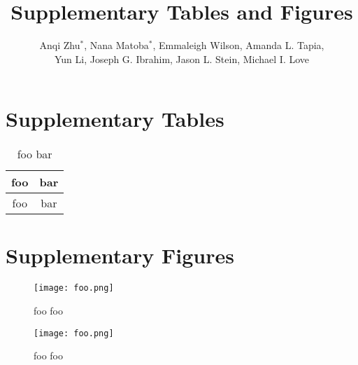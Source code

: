 \documentclass[11pt]{article}
\title{Supplementary Tables and Figures}
\author{Anqi Zhu$^*$, Nana Matoba$^*$, Emmaleigh Wilson, Amanda L. Tapia,
  \\ Yun Li, Joseph G. Ibrahim, Jason L. Stein, Michael I. Love}
\begin{document}
\maketitle

\section*{Supplementary Tables}

\begin{table}[!ht]
\centering
\begin{tabular}{c|c}
foo & bar \\
\hline
foo & bar \\
\end{tabular}
\caption{foo bar} 
\end{table}

\clearpage

\section*{Supplementary Figures}

\begin{figure}[!ht]
  \centering
  \texttt{[image: foo.png]}
  \caption{foo foo}
\end{figure}

\begin{figure}[!ht]
  \centering
  \texttt{[image: foo.png]}
  \caption{foo foo}
\end{figure}
\end{document}
